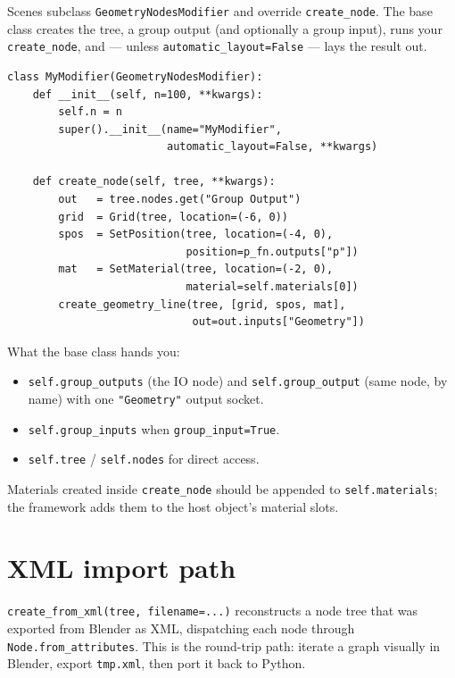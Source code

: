\documentclass[10pt,a4paper,twocolumn]{article}
\newcommand{\code}[1]{\texttt{\small #1}}
\begin{document}
Scenes subclass \code{GeometryNodesModifier} and override
\code{create\_node}. The base class creates the tree, a group output (and
optionally a group input), runs your \code{create\_node}, and --- unless
\code{automatic\_layout=False} --- lays the result out.

\begin{lstlisting}
class MyModifier(GeometryNodesModifier):
    def __init__(self, n=100, **kwargs):
        self.n = n
        super().__init__(name="MyModifier",
                         automatic_layout=False, **kwargs)

    def create_node(self, tree, **kwargs):
        out   = tree.nodes.get("Group Output")
        grid  = Grid(tree, location=(-6, 0))
        spos  = SetPosition(tree, location=(-4, 0),
                            position=p_fn.outputs["p"])
        mat   = SetMaterial(tree, location=(-2, 0),
                            material=self.materials[0])
        create_geometry_line(tree, [grid, spos, mat],
                             out=out.inputs["Geometry"])
\end{lstlisting}

What the base class hands you:
\begin{itemize}[leftmargin=12pt,itemsep=1pt]
\item \code{self.group\_outputs} (the IO node) and
  \code{self.group\_output} (same node, by name) with one
  \code{"Geometry"} output socket.
\item \code{self.group\_inputs} when \code{group\_input=True}.
\item \code{self.tree} / \code{self.nodes} for direct access.
\end{itemize}
Materials created inside \code{create\_node} should be appended to
\code{self.materials}; the framework adds them to the host object's
material slots.

\section{XML import path}

\code{create\_from\_xml(tree, filename=...)} reconstructs a node tree that
was exported from Blender as XML, dispatching each node through
\code{Node.from\_attributes}. This is the round-trip path: iterate a graph
visually in Blender, export \code{tmp.xml}, then port it back to Python.
\end{document}
